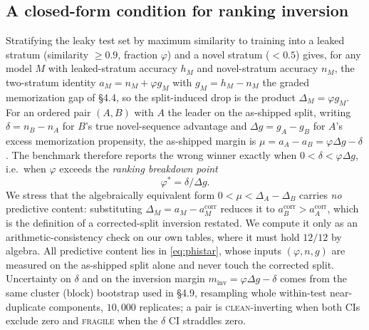 \subsection{A closed-form condition for ranking inversion}\label{sec:m-law}
Stratifying the leaky test set by maximum similarity to training into a leaked stratum (similarity $\ge0.9$, fraction $\varphi$) and a novel stratum ($<0.5$) gives, for any model $M$ with leaked-stratum accuracy $h_M$ and novel-stratum accuracy $n_M$, the two-stratum identity $a_M=n_M+\varphi g_M$ with $g_M=h_M-n_M$ the graded memorization gap of \S4.4, so the split-induced drop is the product $\Delta_M=\varphi g_M$. For an ordered pair $(A,B)$ with $A$ the leader on the as-shipped split, writing $\delta=n_B-n_A$ for $B$'s true novel-sequence advantage and $\Delta g=g_A-g_B$ for $A$'s excess memorization propensity, the as-shipped margin is $\mu=a_A-a_B=\varphi\Delta g-\delta$. The benchmark therefore reports the wrong winner exactly when $0<\delta<\varphi\Delta g$, i.e.\ when $\varphi$ exceeds the \emph{ranking breakdown point}
\begin{equation}\varphi^{*}=\delta/\Delta g.\label{eq:phistar}\end{equation}
We stress that the algebraically equivalent form $0<\mu<\Delta_A-\Delta_B$ carries \emph{no} predictive content: substituting $\Delta_M=a_M-a_M^{\mathrm{corr}}$ reduces it to $a_B^{\mathrm{corr}}>a_A^{\mathrm{corr}}$, which is the definition of a corrected-split inversion restated. We compute it only as an arithmetic-consistency check on our own tables, where it must hold $12/12$ by algebra. All predictive content lies in \eqref{eq:phistar}, whose inputs $(\varphi,n,g)$ are measured on the as-shipped split alone and never touch the corrected split. Uncertainty on $\delta$ and on the inversion margin $m_{\mathrm{inv}}=\varphi\Delta g-\delta$ comes from the same cluster (block) bootstrap used in \S4.9, resampling whole within-test near-duplicate components, $10{,}000$ replicates; a pair is \textsc{clean}-inverting when both CIs exclude zero and \textsc{fragile} when the $\delta$ CI straddles zero.

